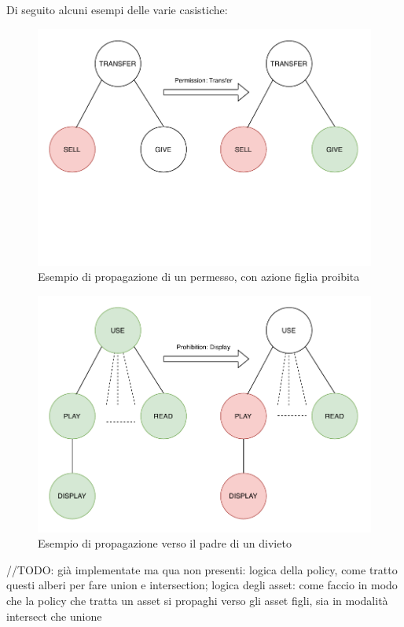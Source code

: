 \documentclass[12pt,a4paper,twoside]{book}
\begin{document}
Di seguito alcuni esempi delle varie casistiche:
\begin{figure}[H]
\centering
\includegraphics[scale=.50]{../immagini/propagationPerm}
\caption{Esempio di propagazione di un permesso, con azione figlia proibita}
\label{examplePerm}
\end{figure}
\begin{figure}[htp]
\centering
\includegraphics[scale=.50]{../immagini/propagationProParent}
\caption{Esempio di propagazione verso il padre di un divieto}
\label{exampleProParent}
\end{figure}
//TODO: già implementate ma qua non presenti: logica della policy, come tratto questi alberi per fare union e intersection; logica degli asset: come faccio in modo che la policy che tratta un asset si propaghi verso gli asset figli, sia in modalità intersect che unione
\end{document}

